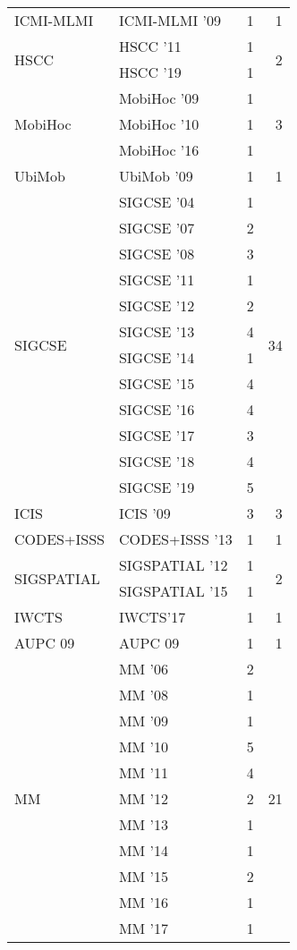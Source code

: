\begin{table*}[t]
\begin{tabular}{llrr}
\multirow{1}{*}{ICMI-MLMI } & ICMI-MLMI '09 & 1 & \multirow{1}{*}{1}\\
\multirow{2}{*}{HSCC } & HSCC '11 & 1 & \multirow{2}{*}{2}\\
& HSCC '19 & 1 &\\
\multirow{3}{*}{MobiHoc } & MobiHoc '09 & 1 & \multirow{3}{*}{3}\\
& MobiHoc '10 & 1 &\\
& MobiHoc '16 & 1 &\\
\multirow{1}{*}{UbiMob } & UbiMob '09 & 1 & \multirow{1}{*}{1}\\
\multirow{12}{*}{SIGCSE } & SIGCSE '04 & 1 & \multirow{12}{*}{34}\\
& SIGCSE '07 & 2 &\\
& SIGCSE '08 & 3 &\\
& SIGCSE '11 & 1 &\\
& SIGCSE '12 & 2 &\\
& SIGCSE '13 & 4 &\\
& SIGCSE '14 & 1 &\\
& SIGCSE '15 & 4 &\\
& SIGCSE '16 & 4 &\\
& SIGCSE '17 & 3 &\\
& SIGCSE '18 & 4 &\\
& SIGCSE '19 & 5 &\\
\multirow{1}{*}{ICIS } & ICIS '09 & 3 & \multirow{1}{*}{3}\\
\multirow{1}{*}{CODES+ISSS } & CODES+ISSS '13 & 1 & \multirow{1}{*}{1}\\
\multirow{2}{*}{SIGSPATIAL } & SIGSPATIAL '12 & 1 & \multirow{2}{*}{2}\\
& SIGSPATIAL '15 & 1 &\\
\multirow{1}{*}{IWCTS} & IWCTS'17 & 1 & \multirow{1}{*}{1}\\
\multirow{1}{*}{AUPC 09} & AUPC 09 & 1 & \multirow{1}{*}{1}\\
\multirow{11}{*}{MM } & MM '06 & 2 & \multirow{11}{*}{21}\\
& MM '08 & 1 &\\
& MM '09 & 1 &\\
& MM '10 & 5 &\\
& MM '11 & 4 &\\
& MM '12 & 2 &\\
& MM '13 & 1 &\\
& MM '14 & 1 &\\
& MM '15 & 2 &\\
& MM '16 & 1 &\\
& MM '17 & 1 &\\

\end{tabular}
\end{table*}
